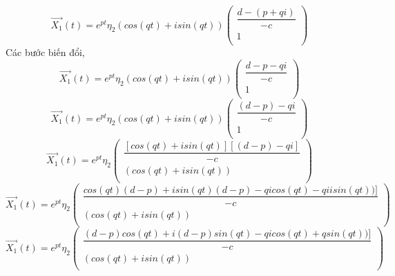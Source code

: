     \begin{equation*}
        \vec{X_1}(t)=
        e^{pt}\eta_2
        (cos(qt) + i sin(qt))
        \begin{pmatrix}
            \dfrac{d - (p + qi)}{-c} \\
            1 \\
        \end{pmatrix}
    \end{equation*}
    Các bước biến đổi,
    \begin{equation*}
        \vec{X_1}(t)=
        e^{pt}\eta_2
        (cos(qt) + i sin(qt))
        \begin{pmatrix}
            \dfrac{d - p - qi}{-c} \\
            1 \\
        \end{pmatrix}
    \end{equation*}
    \begin{equation*}
        \vec{X_1}(t)=
        e^{pt}\eta_2
        (cos(qt) + i sin(qt))
        \begin{pmatrix}
            \dfrac{(d - p) - qi}{-c} \\
            1 \\
        \end{pmatrix}
    \end{equation*}
    \begin{equation*}
        \vec{X_1}(t)=
        e^{pt}\eta_2
        \begin{pmatrix}
            \dfrac{[cos(qt) + i sin(qt)][(d - p) - qi]}{-c} \\
            (cos(qt) + i sin(qt)) \\
        \end{pmatrix}
    \end{equation*}
    \begin{equation*}
        \vec{X_1}(t)=
        e^{pt}\eta_2
        \begin{pmatrix}
            \dfrac{cos(qt)(d - p) + i sin(qt)(d - p) - q i cos(qt) - q i i sin(qt)) ]}{-c} \\
            (cos(qt) + i sin(qt)) \\
        \end{pmatrix}
    \end{equation*}
    \begin{equation*}
        \vec{X_1}(t)=
        e^{pt}\eta_2
        \begin{pmatrix}
            \dfrac{(d - p)cos(qt) + i (d - p) sin(qt) - q i cos(qt) + q sin(qt)) ]}{-c} \\
            (cos(qt) + i sin(qt)) \\
        \end{pmatrix}
    \end{equation*}
